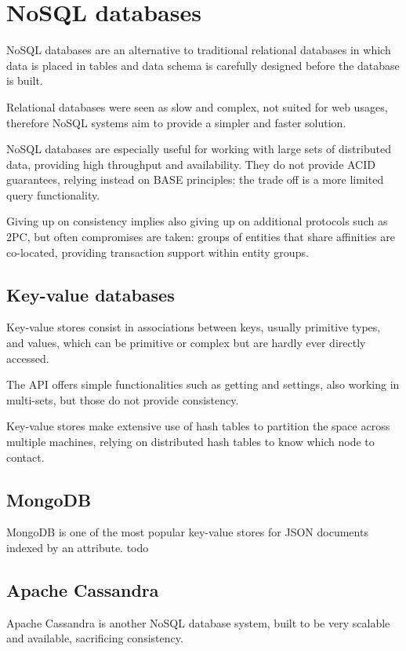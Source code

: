 \section{NoSQL databases}
NoSQL databases are an alternative to traditional relational databases in which data is placed in tables and data schema is carefully designed before the database is built. 

Relational databases were seen as slow and complex, not suited for web usages, therefore NoSQL systems aim to provide a simpler and faster solution. 

NoSQL databases are especially useful for working with large sets of distributed data, providing high throughput and availability. They do not provide ACID guarantees, relying instead on BASE principles: the trade off is a more limited query functionality.

Giving up on consistency implies also giving up on additional protocols such as 2PC, but often compromises are taken: groups of entities that share affinities are co-located, providing transaction support within entity groups.

\subsection{Key-value databases}
Key-value stores consist in associations between keys, usually primitive types, and values, which can be primitive or complex but are hardly ever directly accessed.

The API offers simple functionalities such as getting and settings, also working in multi-sets, but those do not provide consistency. 

Key-value stores make extensive use of hash tables to partition the space across multiple machines, relying on distributed hash tables to know which node to contact.

\subsection{MongoDB}
MongoDB is one of the most popular key-value stores for JSON documents indexed by an attribute.
todo


\subsection{Apache Cassandra}
Apache Cassandra is another NoSQL database system, built to be very scalable and available, sacrificing consistency. 

